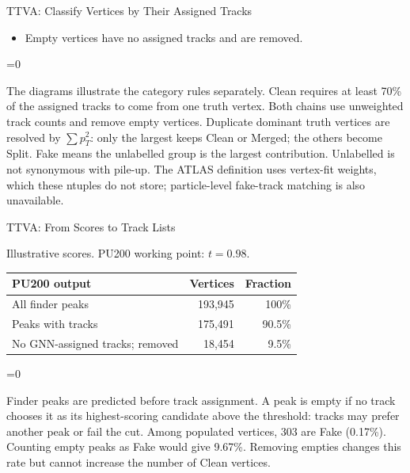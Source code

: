 \documentclass[xcolor=table,aspectratio=169]{beamer}
\providecommand{\talkbuild}{0}
\newcommand{\readingonly}[1]{\ifnum\talkbuild=0\relax#1\fi}
\newcommand{\readingnote}[1]{\readingonly{\par\vspace{.35em}%
  {\footnotesize\color{black!65}#1\par}}}
\newcommand{\context}[1]{{\centering\footnotesize\color{black!55}#1\par}\vspace{.65em}}
\begin{document}
\begin{frame}{TTVA: Classify Vertices by Their Assigned Tracks}
{{\begin{tikzpicture}[x=1cm,y=1cm,>=Latex,font=\small]
    \end{tikzpicture}}\par}\begin{itemize}\small\item Empty vertices have no assigned tracks and are removed.\end{itemize}\readingnote{The diagrams illustrate the category rules separately. Clean requires at least 70\% of the assigned tracks to come from one truth vertex. Both chains use unweighted track counts and remove empty vertices. Duplicate dominant truth vertices are resolved by $\sum p_T^2$: only the largest keeps Clean or Merged; the others become Split. Fake means the unlabelled group is the largest contribution. Unlabelled is not synonymous with pile-up. The ATLAS definition uses vertex-fit weights, which these ntuples do not store; particle-level fake-track matching is also unavailable.}
\end{frame}


\begin{frame}{TTVA: From Scores to Track Lists}
\relax

\centering
{}
\par\vspace{.9em}
\context{Illustrative scores. PU200 working point: $t=0.98$.}
\small
\begin{tabular}{lrr}\toprule
PU200 output & Vertices & Fraction\\\midrule
All finder peaks & 193,945 & 100\%\\
Peaks with tracks & 175,491 & 90.5\%\\
No GNN-assigned tracks; removed & 18,454 & 9.5\%\\\bottomrule
\end{tabular}
\readingnote{Finder peaks are predicted before track assignment. A peak is empty if no track chooses it as its highest-scoring candidate above the threshold: tracks may prefer another peak or fail the cut. Among populated vertices, 303 are Fake (0.17\%). Counting empty peaks as Fake would give 9.67\%. Removing empties changes this rate but cannot increase the number of Clean vertices.}
\end{frame}
\end{document}
